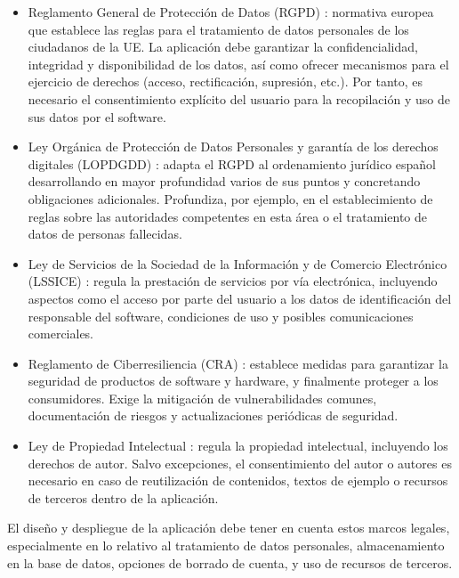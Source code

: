 \begin{itemize}
    \item Reglamento General de Protección de Datos (RGPD) \cite{rgpd}: normativa europea que establece las reglas para el tratamiento de datos personales de los ciudadanos de la UE. La aplicación debe garantizar la confidencialidad, integridad y disponibilidad de los datos, así como ofrecer mecanismos para el ejercicio de derechos (acceso, rectificación, supresión, etc.). Por tanto, es necesario el consentimiento explícito del usuario para la recopilación y uso de sus datos por el software.

    \item Ley Orgánica de Protección de Datos Personales y garantía de los derechos digitales (LOPDGDD) \cite{lopdgdd}: adapta el RGPD al ordenamiento jurídico español desarrollando en mayor profundidad varios de sus puntos y concretando obligaciones adicionales. Profundiza, por ejemplo, en el establecimiento de reglas sobre las autoridades competentes en esta área o el tratamiento de datos de personas fallecidas.

    \item Ley de Servicios de la Sociedad de la Información y de Comercio Electrónico (LSSICE) \cite{lssice}: regula la prestación de servicios por vía electrónica, incluyendo aspectos como el acceso por parte del usuario a los datos de identificación del responsable del software, condiciones de uso y posibles comunicaciones comerciales.

    \item Reglamento de Ciberresiliencia (CRA) \cite{cra_ue}: establece medidas para garantizar la seguridad de productos de software y hardware, y finalmente proteger a los consumidores. Exige la mitigación de vulnerabilidades comunes, documentación de riesgos y actualizaciones periódicas de seguridad.

    \item Ley de Propiedad Intelectual \cite{lpi}: regula la propiedad intelectual, incluyendo los derechos de autor. Salvo excepciones, el consentimiento del autor o autores es necesario en caso de reutilización de contenidos, textos de ejemplo o recursos de terceros dentro de la aplicación.
\end{itemize}

El diseño y despliegue de la aplicación debe tener en cuenta estos marcos legales, especialmente en lo relativo al tratamiento de datos personales, almacenamiento en la base de datos, opciones de borrado de cuenta, y uso de recursos de terceros.

